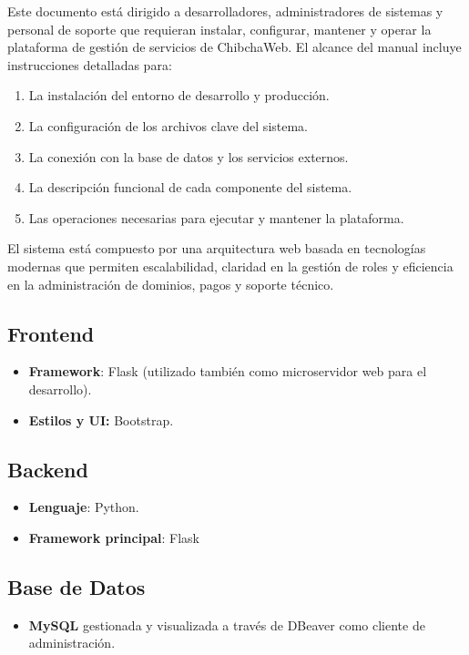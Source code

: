 Este documento está dirigido a desarrolladores, administradores de sistemas y personal de soporte que requieran instalar, configurar, mantener y operar la plataforma de gestión de servicios de ChibchaWeb.
El alcance del manual incluye instrucciones detalladas para:

\begin{enumerate}
    \item {La instalación del entorno de desarrollo y producción.}
    \item {La configuración de los archivos clave del sistema.}
    \item {La conexión con la base de datos y los servicios externos.}
    \item {La descripción funcional de cada componente del sistema.}
    \item {Las operaciones necesarias para ejecutar y mantener la plataforma.}
\end{enumerate}


El sistema está compuesto por una arquitectura web basada en tecnologías modernas que permiten escalabilidad, claridad en la gestión de roles y eficiencia en la administración de dominios, pagos y soporte técnico.

\subsection{Frontend}
\begin{itemize}
    \item \textbf{Framework}: Flask (utilizado también como microservidor web para el desarrollo). \cite{flask}
    \item \textbf{Estilos y UI:} Bootstrap. \cite{bootstrap}
\end{itemize}


\subsection{Backend}
\begin{itemize}
    \item \textbf{Lenguaje}: Python.
    \item \textbf{Framework principal}: Flask
\end{itemize}


\subsection{Base de Datos}
\begin{itemize}
    \item \textbf{MySQL} gestionada y visualizada a través de DBeaver como cliente de administración. \cite{mysql}
\end{itemize}



